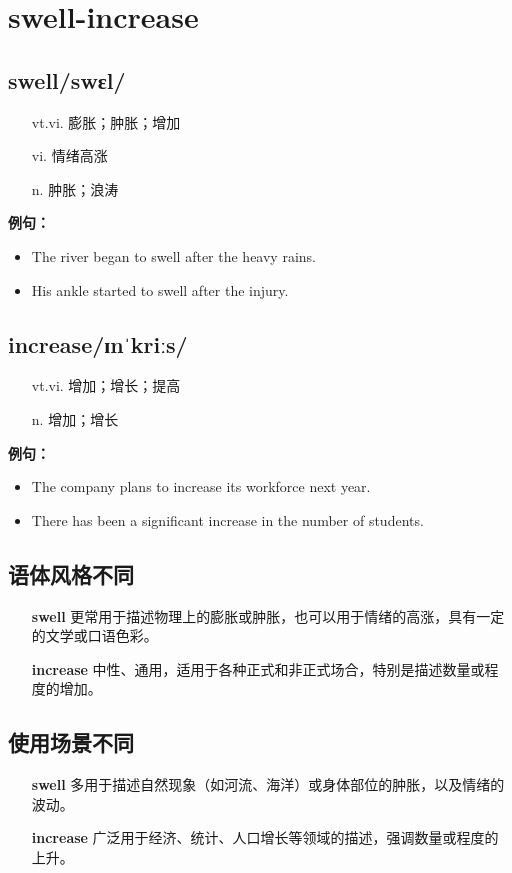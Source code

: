\documentclass[12pt]{article}
\begin{document}
\section*{swell-increase}
\begin{multicols}{2}
\subsection*{\textbf{swell}\quad/swɛl/}
\begin{itemize}[leftmargin=2em]
\item[vt.vi.] 膨胀；肿胀；增加
\item[vi.] 情绪高涨
\item[n.] 肿胀；浪涛
\end{itemize}
\textbf{例句：}
\begin{itemize}[leftmargin=2em]
\item The river began to swell after the heavy rains.
\item His ankle started to swell after the injury.
\end{itemize}
\subsection*{\textbf{increase}\quad/ɪnˈkriːs/}
\begin{itemize}[leftmargin=2em]
\item[vt.vi.] 增加；增长；提高
\item[n.] 增加；增长
\end{itemize}
\textbf{例句：}
\begin{itemize}[leftmargin=2em]
\item The company plans to increase its workforce next year.
\item There has been a significant increase in the number of students.
\end{itemize}
\end{multicols}
\subsection*{语体风格不同}
\begin{itemize}
\item[\textbf{swell}] 更常用于描述物理上的膨胀或肿胀，也可以用于情绪的高涨，具有一定的文学或口语色彩。
\item[\textbf{increase}] 中性、通用，适用于各种正式和非正式场合，特别是描述数量或程度的增加。
\end{itemize}
\subsection*{使用场景不同}
\begin{itemize}
\item[\textbf{swell}] 多用于描述自然现象（如河流、海洋）或身体部位的肿胀，以及情绪的波动。
\item[\textbf{increase}] 广泛用于经济、统计、人口增长等领域的描述，强调数量或程度的上升。
\end{itemize}
\end{document}
